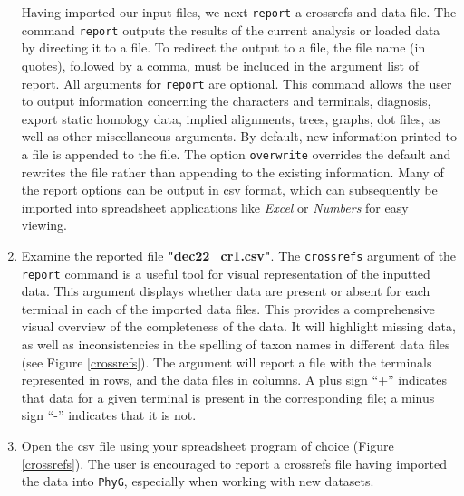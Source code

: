 \documentclass[11pt]{article}
\begin{document}
\begin{enumerate}
Having imported our input files, we next \texttt{report} a crossrefs and data file.
The command \texttt{report} outputs the results of the current analysis or loaded 
data by directing it to a file. To redirect the output to a file, the file name (in quotes), 
followed by a comma, must be included in the argument list of report. All arguments 
for \texttt{report} are optional. This command allows the user to output information 
concerning the characters and terminals, diagnosis, export static homology data, 
implied alignments, trees, graphs, dot files, as well as other miscellaneous arguments. 
By default, new information printed to a file is appended to the file. The option 
\texttt{overwrite} overrides the default and rewrites the file rather than appending 
to the existing information. Many of the report options can be output in csv format, 
which can subsequently be imported into spreadsheet applications like \textit{Excel} 
or \textit{Numbers} for easy viewing. 

\item Examine the reported file \textbf{"dec22\_cr1.csv"}. The \texttt{crossrefs} 
argument of the \texttt{report} command is a useful tool for visual representation 
of the inputted data. This argument displays whether data are present or absent 
for each terminal in each of the imported data files. This provides a comprehensive 
visual overview of the completeness of the data. It will highlight missing data, as 
well as inconsistencies in the spelling of taxon names in different data files (see 
Figure \ref{crossrefs}). The argument will report a file with the terminals represented 
in rows, and the data files in columns. A plus sign ``+'' indicates that data for a given 
terminal is present in the corresponding file; a minus sign ``-'' indicates that it is not.

\item Open the csv file using  your spreadsheet program of choice (Figure 
\ref{crossrefs}). The user is encouraged to report a crossrefs file having imported 
the data into \texttt{PhyG}, especially when working with new datasets. 


\end{enumerate}
\end{document}
